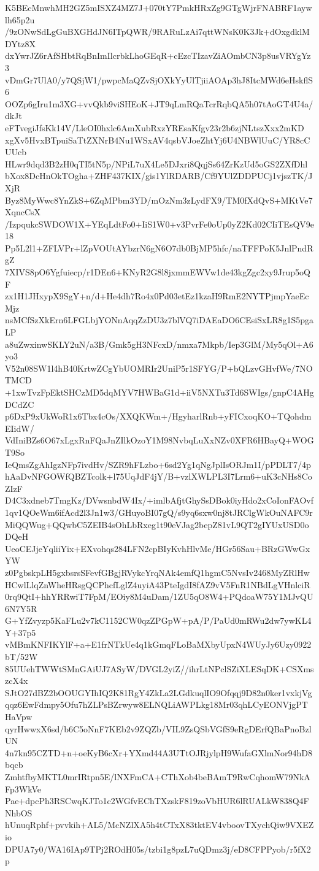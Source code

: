 K5BEcMnwhMH2GZ5mISXZ4MZ7J+070tY7PmkHRxZg9GTgWjrFNABRF1aywlh65p2u
/9zONwSdLgGuBXGHdJN6ITpQWR/9RARuLzAi7qttWNsK0K3Jk+dOxgdklMDYtz8X
dxYwrJZ6rAfSHbtRqBnImIlcrbkLhoGEqR+cEzcTIzavZiAOmbCN3p8usVRYgYz3
vDmGr7UlA0/y7QSjW1/pwpcMaQZvSjOXkYyUlTjiiAOAp3hJ8ItcMWd6eHskflS6
OOZp6gIru1m3XG+vvQkb9viSHEoK+JT9qLmRQaTcrRqbQA5h07tAoGT4U4a/dkJt
eFTvegiJfsKk14V/LleOI0hxlc6AmXubRxzYREsaKfgv23r2b6zjNLtszXxx2mKD
xgXv5HvxBTpuiSaTtZXNrB4Nu1WSxAV4qsbVJoeZhtYj6U4NBWlUuC/YR8cCUUcb
HLwr9dqd3B2zH0qTI5tN5p/NPiL7uX4Le5DJxri8QqjSs64ZrKzUd5oGS2ZXfDhl
bXox8DcHnOkTOgha+ZHF437KIX/gis1YlRDARB/Cf9YUlZDDPUCj1vjszTK/JXjR
Byz8MyWwc8YnZkS+6ZqMPbm3YD/mOzNm3zLydFX9/TM0fXdQvS+MKtVe7XqncCsX
/IzpqukcSWDOW1X+YEqLdtFo0+IiS1W0+v3PvrFe0oUp0yZ2Kd02CIiTEsQV9e18
Pp5L2l1+ZFLVPr+lZpVOUtAYbzrN6gN6O7db0BjMP5hfc/naTFFPoK5JnlPndRgZ
7XIVS8pO6Ygfuiecp/r1DEn6+KNyR2G8l8jxmmEWVw1de43kgZgc2xy9Jrup5oQF
zx1H1JHxypX9SgY+n/d+He4dh7Ro4x0Pd03etEz1kzaH9RmE2NYTPjmpYaeEcMjz
nsMCfSzXkErn6LFGLbjYONnAqqZzDU3z7blVQ7iDAEaDO6CEsiSxLR8g1S5pgaLP
a8uZwxinwSKLY2uN/a3B/Gmk5gH3NFcxD/nmxa7Mkpb/Iep3GlM/My5qOl+A6yo3
V52n08SW1l4hB40KrtwZCgYbUOMRIr2UniP5r1SFYG/P+bQLzvGHvfWe/7NOTMCD
+1xwTvzFpEktSHCzMD5dqMYV7HWBaG1d+iiV5NXTu3Td6SWIgs/gnpC4AHgDCdZC
p6DxP9xUkWoR1x6Tbx4cOs/XXQKWm+/HgyharlRnb+yFICxoqKO+TQohdmEIidW/
VdIniBZs6O67xLgxRnFQaJnZIlkOzoY1M98NvbqLuXxNZv0XFR6HBayQ+WOGT9So
IeQmsZgAhIgzNFp7ivdHv/SZR9hFLzbo+6sd2Yg1qNgJplIsORJm1I/pPDLT7/4p
hAaDvNFGOWfQBZTcolk+l75UqJdF4jY/B+vzlXWLPL3I7Lrm6+uK3cNHs8CoZIzF
D4C3xdneb7TmgKz/DVwsnbdW4Ix/+imlbAfjtGhySsDBok0iyHdo2xCoIonFAOvf
1qv1QOeWm6ifAcd2l3Jn1w3/GHuyoBI07gQ/s9yq6sxw0nj8tJRClgWkOuNAFC9r
MiQQWug+QQwbC5ZEIB4sOhLbRxeg1t90eVJag2bepZ81vL9QT2gIYUxUSD0oDQeH
UeoCEJjeYqliiYix+EXvohqs284LFN2cpBIyKvhHlvMe/HGr56Sau+BRzGWwGxYW
z0PgbskpLH5gxbsrsSFevfGBgjRVykcYrqNAk4emfQ1hgmC5NvsIv2468MyZRlHw
HCwlLlqZnWheHRsgQCPhcfLglZ4uyiA43PteIgdI8fAZ9vV5FnR1NBdLgVHnlciR
0rq9QtI+hhYRRwiT7FpM/EOiy8M4uDam/1ZU5qO8W4+PQdoaW75Y1MJvQU6N7Y5R
G+YfZvyzp5KaFLu2v7kC1152CW0qzZPGpW+pA/P/PaUd0mRWu2dw7ywKL4Y+37p5
vMBmKNFIKYlF+a+E1frNTkUe4q1kGmqFLoBaMXbyUpxN4WUyJy6Uzy0922bT/52W
85UUehTWWtSMnGAiUJ7ASyW/DVGL2yiZ//ihrLtNPclSZiXLESqDK+CSXmszcX4x
SJtO27dBZ2bOOUGYIhIQ2K81RgY4ZkLa2LGdkuqlIO9Ofqqj9D82n0ker1vxkjVg
qqz6EwFdmpy5Ofu7hZLPsBZrwyw8ELNQLiAWPLkg18Mr03qhLCyEONVjgPTHaVpw
qyrHwwxX6sd/b6C5oNnF7KEb2v9ZQZb/VIL9ZsQSbVGfS9eRgDErfQBaPnoBzlUN
4n7kn95CZTD+n+oeKyB6cXr+YXmd44A3UTtOJRjylpH9WufaGXlmNor94hD8bqcb
ZmhtfbyMKTL0mrIRtpn5E/lNXFmCA+CThXob4beBAmT9RwCqhomW79NkAFp3WkVe
Pae+dpcPh3RSCwqKJTo1c2WGfvEChTXzskF819zoVbHUR6lRUALkW838Q4FNhbOS
hUnuqRphf+pvvkih+AL5/McNZlXA5h4tCTxX83tktEV4vboovTXychQiw9VXEZio
DPUA7y0/WA16IAp9TPj2ROdH05s/tzbi1g8pzL7uQDmz3j/eD8CFPPyob/r5fX2p
